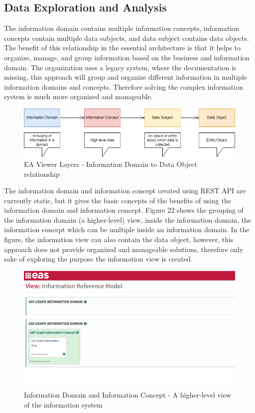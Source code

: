 \documentclass{article}
\begin{document}
\subsection{Data Exploration and Analysis}

The information domain contains multiple information concepts, information concepts contain multiple data subjects, and data subject contains data objects. The benefit of this relationship in the essential architecture is that it helps to organize, manage, and group information based on the business and information domain. The organization uses a legacy system, where the documentation is missing, this approach will group and organize different information in multiple information domains and concepts. Therefore solving the complex information system is much more organized and manageable.

\begin{figure}[ht!]
    \centering
    \includegraphics[scale=0.5]{ea-vis.drawio}
    \caption{EA Viewer Layers  - 
Information Domain to Data Object relationship }
    \label{fig:ea-vis}
\end{figure}

The information domain and information concept created using REST API are currently static, but it gives the basic concepts of the benefits of using the information domain and information concept. Figure 22 shows the grouping of the information domain (a higher-level) view, inside the information domain, the information concept which can be multiple inside an information domain. In the figure, the information view can also contain the data object, however, this approach does not provide organized and manageable solutions, therefore only sake of exploring the purpose the information view is created.

\begin{figure}[ht!]
    \centering
    \includegraphics[scale=0.55]{information-d-andc}
    \caption{Information Domain and Information Concept  - 
A higher-level view of the information system }
    \label{fig:information-domain-and-concept}
\end{figure}
\end{document}
